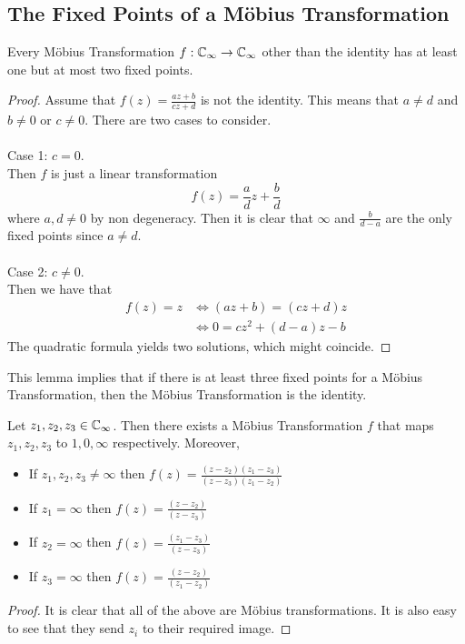 \documentclass[a4paper]{article}
\begin{document}
\subsection{The Fixed Points of a Möbius Transformation}
\begin{lmm}{}{} Every Möbius Transformation $f:\mathbb{C}_\infty\to\mathbb{C}_\infty$ other than the identity has at least one but at most two fixed points. \tcbline
\begin{proof}
Assume that $f(z)=\frac{az+b}{cz+d}$ is not the identity. This means that $a\neq d$ and $b\neq 0$ or $c\neq 0$. There are two cases to consider. \\~\\

Case 1: $c=0$. \\
Then $f$ is just a linear transformation $$f(z)=\frac{a}{d}z+\frac{b}{d}$$ where $a,d\neq 0$ by non degeneracy. Then it is clear that $\infty$ and $\frac{b}{d-a}$ are the only fixed points since $a\neq d$. \\~\\

Case 2: $c\neq 0$. \\
Then we have that 
\begin{align*}
f(z)=z&\iff (az+b)=(cz+d)z\\
&\iff 0=cz^2+(d-a)z-b
\end{align*}
The quadratic formula yields two solutions, which might coincide. 
\end{proof}
\end{lmm}

This lemma implies that if there is at least three fixed points for a Möbius Transformation, then the Möbius Transformation is the identity. 

\begin{prp}{}{} Let $z_1,z_2,z_3\in\mathbb{C}_\infty$. Then there exists a Möbius Transformation $f$ that maps $z_1,z_2,z_3$ to $1,0,\infty$ respectively. Moreover, 
\begin{itemize}
\item If $z_1,z_2,z_3\neq\infty$ then $f(z)=\frac{(z-z_2)(z_1-z_3)}{(z-z_3)(z_1-z_2)}$
\item If $z_1=\infty$ then $f(z)=\frac{(z-z_2)}{(z-z_3)}$
\item If $z_2=\infty$ then $f(z)=\frac{(z_1-z_3)}{(z-z_3)}$
\item If $z_3=\infty$ then $f(z)=\frac{(z-z_2)}{(z_1-z_2)}$
\end{itemize} \tcbline
\begin{proof}
It is clear that all of the above are Möbius transformations. It is also easy to see that they  send $z_i$ to their required image. 
\end{proof}
\end{prp}
\end{document}
